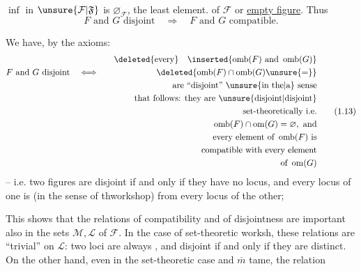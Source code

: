 $\inf$ in $\unsure{\mathcal{F}|\mathfrak{F}}$ is $\varnothing_{\mathcal{F}}$, the least element. of $\mathcal{F}$ or \uline{empty figure}. Thus
\[
F\text{ and }G\text{ disjoint}\quad\Longrightarrow\quad F\text{ and }G\text{ compatible}.
\]

We have, by the axioms:
\[
\begin{aligned}
&&\deleted{\text{every}}\quad\inserted{\operatorname{omb}(F)\text{ and }\operatorname{omb}(G)}\\
F\text{ and }G\text{ disjoint}&\quad\Longleftrightarrow\quad&\deleted{\operatorname{omb}(F)\cap\operatorname{omb}(G)\unsure{=}}\\
&&\text{are ``disjoint'' \unsure{in the|a} sense}\\
&&\text{that follows: they are \unsure{disjoint|disjoint}}\\
&&\text{set-theoretically i.e.}\\
&&\operatorname{omb}(F)\cap\operatorname{om}(G)=\varnothing,\ \text{and}\\
&&\text{every element of }\operatorname{omb}(F)\text{ is}\\
&&\text{compatible with every element}\\
&&\text{of }\operatorname{om}(G)
\end{aligned}\tag*{(1.13)}
\]
-- i.e. two figures are disjoint if and only if they have no  locus, and every locus of one is   (in the sense of thworkshop) from every locus of the other;

This shows that the relations of compatibility and of disjointness are important also in the  sets $\mathcal{M},\mathcal{L}$ of $\mathcal{F}$. In the case of set-theoretic worksh, these relations are ``trivial'' on $\mathcal{L}$: two loci are always  , and disjoint if and only if they are distinct. On the other hand, even in the set-theoretic case and $\overline m$ tame, the relation
